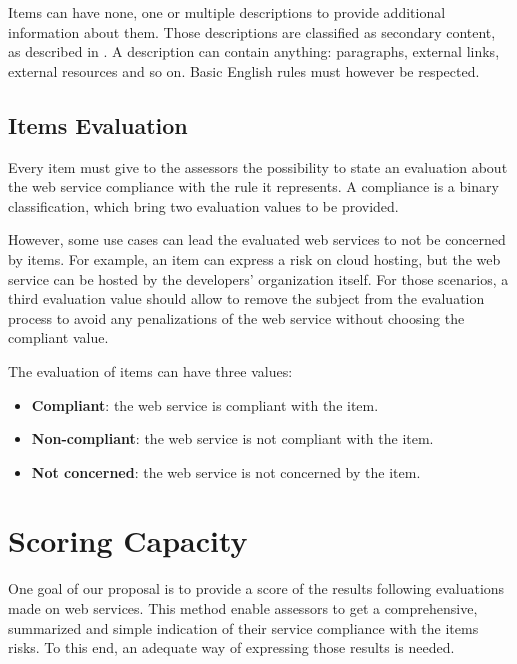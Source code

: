 Items can have none, one or multiple descriptions to provide additional information about them. Those descriptions are classified as secondary content, as described in . A description can contain anything: paragraphs, external links, external resources and so on. Basic English rules must however be respected.

\subsection{Items Evaluation}
\label{subsec:proposal_content_evaluation}

Every item must give to the assessors the possibility to state an evaluation about the web service compliance with the rule it represents. A compliance is a binary classification, which bring two evaluation values to be provided.

However, some use cases can lead the evaluated web services to not be concerned by items. For example, an item can express a risk on \gls{cloud} hosting, but the web service can be hosted by the developers' organization itself. For those scenarios, a third evaluation value should allow to remove the subject from the evaluation process to avoid any penalizations of the web service without choosing the compliant value.

The evaluation of items can have three values:
\begin{itemize}
	\item \textbf{Compliant}: the web service is compliant with the item.
	\item \textbf{Non-compliant}: the web service is not compliant with the item.
	\item \textbf{Not concerned}: the web service is not concerned by the item.
\end{itemize}


\section{Scoring Capacity}
\label{sec:proposal_scoring}

One goal of our proposal is to provide a score of the results following evaluations made on web services. This method enable assessors to get a comprehensive, summarized and simple indication of their service compliance with the items risks. To this end, an adequate way of expressing those results is needed.

